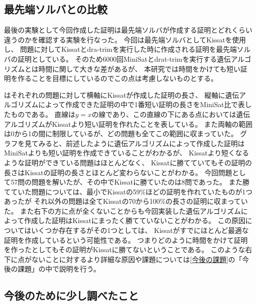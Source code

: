 \subsection{最先端ソルバとの比較}

最後の実験として今回作成した証明は最先端ソルバが作成する証明とどれくらい違うのかを確認する実験を行なった。
今回は最先端ソルバとしてKissatを使用し、
問題に対してKissatとdra-trimを実行した時に作成される証明を最先端ソルバの証明としている。
そのため6000回MiniSatとdrat-trimを実行する遺伝アルゴリズムとは時間に関して大きな差があるが、
本研究では時間をかけても短い証明を作ることを目標にしているのでこの点は考慮しないものとする。


はそれぞれの問題に対して横軸にKissatが作成した証明の長さ、
縦軸に遺伝アルゴリズムによって作成できた証明の中で1番短い証明の長さをMiniSat比で表したものである。
直線は$y=x$の線であり、この直線の下にある点においては遺伝アルゴリズムがKissatより短い証明を作れたことを表している。
また両軸の範囲は0から1の間に制限しているが、どの問題も全てこの範囲に収まっていた。
グラフを見てみると、前述したように遺伝アルゴリズムによって作成した証明はMiniSatよりも短い証明を作成できていることがわかるが、
Kissatより短くなるような証明ができている問題はほとんどなく、
Kissatに勝てていてもその証明の長さはKissatの証明の長さとほとんど変わらないことがわかる。
今回問題として57問の問題を解いたが、その中でKissatに勝ていたのは8問であった。
また勝てていた問題については、最小でKissatの59\%ほどの証明を作れていたものが1つあったが
それ以外の問題は全てKissatの70から100\%の長さの証明に収まっていた。
また右下の方に点が全くないことからも今回実装した遺伝アルゴリズムによって作成した証明はKissatにまったく勝てていないことがわかる。
この原因についてはいくつか存在するがその1つとしては、
Kissatがすでにほとんど最適な証明を作成しているという可能性である。
つまりどのように時間をかけて証明を作ったとしてもその証明がKissatに勝てないということである。
このような右下に点がないことに対するより詳細な原因や課題については\ref{今後の課題}の「今後の課題」の中で説明を行う。

\subsection{今後のために少し調べたこと}


